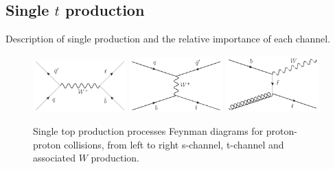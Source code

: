 
\subsection{Single $t$ production}
\label{subsec:topsing}

Description of single production and the relative importance of each channel.

\begin{figure}[!Hhtbp]
  \begin{center}
    \includegraphics[width=0.32\textwidth]{figs/Schannel_top_single.jpg}
    \includegraphics[width=0.32\textwidth]{figs/Tchannel_top_single.jpg}
    \includegraphics[width=0.32\textwidth]{figs/TWchannel_top_single.jpg}
    \caption{Single top production processes Feynman diagrams for proton-proton collisions, from left to right s-channel, t-channel and associated $W$ production.}
    \label{fig:PairProduction}
  \end{center}
\end{figure}

